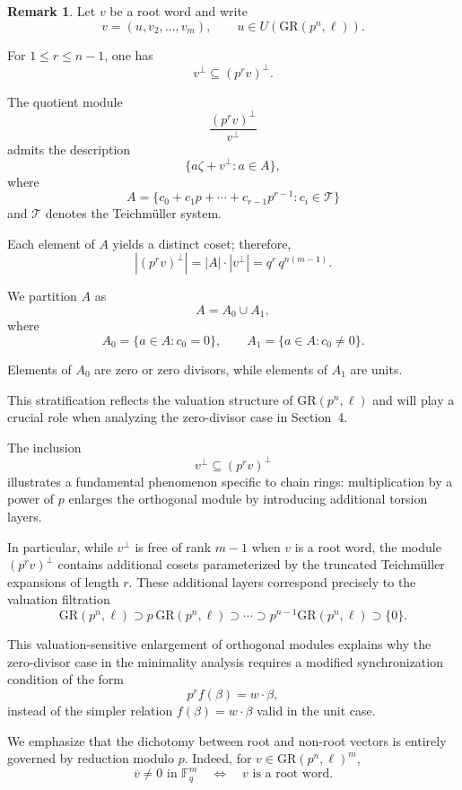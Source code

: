 \documentclass[10pt]{article}
\theoremstyle{definition}
\newtheorem{remark}[lem]{Remark}
\begin{document}
\begin{remark}\label{Remark 18}
Let $v$ be a root word and write
\[
v=(u,v_2,\dots,v_m),
\qquad
u \in U(\mathrm{GR}(p^{n},\ell)).
\]

For $1 \le r \le n-1$, one has
\[
v^{\perp} \subseteq (p^{r}v)^{\perp}.
\]

The quotient module
\[
\frac{(p^{r}v)^{\perp}}{v^{\perp}}
\]
admits the description
\[
\{a \zeta + v^{\perp} : a \in A\},
\]
where
\[
A=\{c_0 + c_1p + \cdots + c_{r-1}p^{r-1} : c_i \in \mathcal{T}\}
\]
and $\mathcal{T}$ denotes the Teichm\"uller system.

Each element of $A$ yields a distinct coset; therefore,
\[
|(p^{r}v)^{\perp}|
=
|A|\cdot |v^{\perp}|
=
q^{r}\, q^{n(m-1)}.
\]

We partition $A$ as
\[
A=A_0 \cup A_1,
\]
where
\[
A_0=\{a\in A : c_0=0\},
\qquad
A_1=\{a\in A : c_0\neq 0\}.
\]

Elements of $A_0$ are zero or zero divisors,
while elements of $A_1$ are units.

This stratification reflects the valuation structure of
$\mathrm{GR}(p^{n},\ell)$ and will play a crucial role
when analyzing the zero-divisor case in Section~4.
\end{remark}




\medskip

The inclusion
\[
v^{\perp} \subseteq (p^{r}v)^{\perp}
\]
illustrates a fundamental phenomenon specific to chain rings:
multiplication by a power of $p$ enlarges the orthogonal module
by introducing additional torsion layers.

In particular, while $v^{\perp}$ is free of rank $m-1$
when $v$ is a root word,
the module $(p^{r}v)^{\perp}$ contains additional cosets
parameterized by the truncated Teichm\"uller expansions of length $r$.
These additional layers correspond precisely to the valuation filtration
\[
\mathrm{GR}(p^{n},\ell)
\supset p\,\mathrm{GR}(p^{n},\ell)
\supset \cdots
\supset p^{n-1}\mathrm{GR}(p^{n},\ell)
\supset \{0\}.
\]

This valuation-sensitive enlargement of orthogonal modules
explains why the zero-divisor case in the minimality analysis
requires a modified synchronization condition
of the form
\[
p^{r}f(\beta)=w\cdot\beta,
\]
instead of the simpler relation $f(\beta)=w\cdot\beta$
valid in the unit case.

\medskip

We emphasize that the dichotomy between root and non-root vectors
is entirely governed by reduction modulo $p$.
Indeed, for $v \in \mathrm{GR}(p^{n},\ell)^m$,
\[
\overline{v} \neq 0 \text{ in } \mathbb{F}_q^m
\quad \Longleftrightarrow \quad
v \text{ is a root word}.
\]
\end{document}
